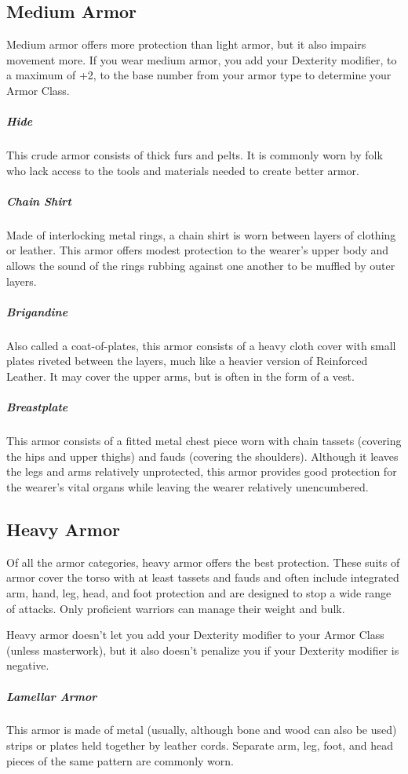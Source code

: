 \subsection{Medium Armor}

Medium armor offers more protection than light armor, but it also impairs movement more. If you wear medium armor, you add your Dexterity modifier, to a maximum of +2, to the base number from your armor type to determine your Armor Class.

\subparagraph*{Hide} This crude armor consists of thick furs and pelts. It is commonly worn by folk who lack access to the tools and materials needed to create better armor.

\subparagraph*{Chain Shirt} Made of interlocking metal rings, a chain shirt is worn between layers of clothing or leather. This armor offers modest protection to the wearer's upper body and allows the sound of the rings rubbing against one another to be muffled by outer layers.

\subparagraph*{Brigandine} Also called a coat-of-plates, this armor consists of a heavy cloth cover with small plates riveted between the layers, much like a heavier version of Reinforced Leather. It may cover the upper arms, but is often in the form of a vest.

\subparagraph*{Breastplate} This armor consists of a fitted metal chest piece worn with chain tassets (covering the hips and upper thighs) and fauds (covering the shoulders). Although it leaves the legs and arms relatively unprotected, this armor provides good protection for the wearer's vital organs while leaving the wearer relatively unencumbered.

\subsection{Heavy Armor}

Of all the armor categories, heavy armor offers the best protection. These suits of armor cover the torso with at least tassets and fauds and often include integrated arm, hand, leg, head, and foot protection and are designed to stop a wide range of attacks. Only proficient warriors can manage their weight and bulk.

Heavy armor doesn't let you add your Dexterity modifier to your Armor Class (unless masterwork), but it also doesn't penalize you if your Dexterity modifier is negative.

\subparagraph*{Lamellar Armor} This armor is made of metal (usually, although bone and wood can also be used) strips or plates held together by leather cords. Separate arm, leg, foot, and head pieces of the same pattern are commonly worn.


